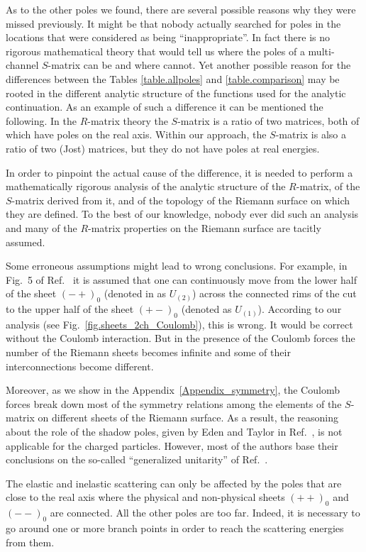 \documentclass[12pt]{article}
\begin{document}
As to the other poles we found, there are several possible reasons why they 
were missed previously. It might be that nobody actually searched for poles in 
the locations that were considered as being ``inappropriate''. In fact there is 
no rigorous mathematical theory that would tell us where the poles of a 
multi-channel $S$-matrix can be and where cannot. Yet another possible reason 
for the differences  between the Tables \ref{table.allpoles} and 
\ref{table.comparison} may be rooted in the different analytic structure of the 
functions used for the analytic continuation. As an example of such a 
difference it can be mentioned the following. In the $R$-matrix theory the 
$S$-matrix is a ratio of two matrices, both of which have poles on the real 
axis. Within our approach, the $S$-matrix is also a ratio of two (Jost) 
matrices, but they do not have poles at real energies.

In order to pinpoint the actual cause of the difference, it is needed to 
perform a mathematically rigorous analysis of the analytic structure of the 
$R$-matrix, of the $S$-matrix derived from it, and of the topology of the 
Riemann surface on which they are defined. To the best of our knowledge, nobody 
ever did such an analysis and many of the $R$-matrix properties on the Riemann 
surface are tacitly assumed.

Some erroneous assumptions might lead to wrong conclusions.
For example, in Fig.~5 of Ref.~\cite{Bogdanova} it is assumed that one can
continuously move from the lower half of the sheet $(-+)_0$ (denoted in
\cite{Bogdanova} as $U_{(2)}$) across the connected rims of the cut to the upper
half of the sheet $(+-)_0$ (denoted as $U_{(1)}$). According to our analysis
(see Fig.~\ref{fig.sheets_2ch_Coulomb}), this is wrong. It would be correct 
without the Coulomb interaction. But in the presence of the Coulomb forces the 
number of the Riemann sheets becomes infinite and some of their 
interconnections become different.

Moreover, as we show in the Appendix~\ref{Appendix_symmetry}, the Coulomb
forces break down most of the symmetry relations among the elements of the
$S$-matrix on different sheets of the Riemann surface. As a result, the
reasoning  about the role of
the shadow poles, given by Eden and Taylor in Ref.~\cite{EdenTaylor}, is not
applicable for the charged particles. However, most of the authors base their
conclusions on the so-called ``generalized unitarity'' of
Ref.~\cite{EdenTaylor}.

The elastic and inelastic scattering can only be affected by the poles that are
close to the real axis where the physical and non-physical
sheets $(++)_0$ and $(--)_0$ are connected. All the other poles are too far.
Indeed, it is necessary to go around one or more branch points in order
to reach the scattering energies from them.
\end{document}
